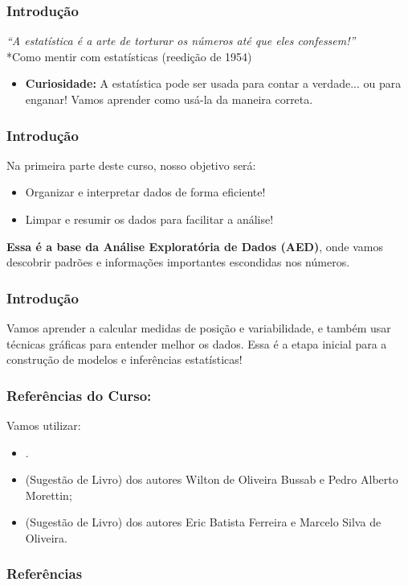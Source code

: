 \documentclass[12pt]{beamer}
\begin{document}
\begin{frame}{}
	\frametitle{Introdução}
	\begin{block}{}
		\justifying
		\textit{``A estatística é a arte de torturar os números até que eles confessem!''}\\
		*Como mentir com estatísticas \cite{huff2016mentir} (reedição de 1954)
		\begin{itemize}
			\item \textbf{Curiosidade:} A estatística pode ser usada para contar a verdade... ou para enganar! Vamos aprender como usá-la da maneira correta.
		\end{itemize}
	\end{block}
\end{frame}

\begin{frame}{}
	\frametitle{Introdução}
	\begin{block}{}
		\justifying
		Na primeira parte deste curso, nosso objetivo será:
		\begin{itemize}
			\item Organizar e interpretar dados de forma eficiente!
			\item Limpar e resumir os dados para facilitar a análise!
		\end{itemize}
		\pause
		\textbf{Essa é a base da Análise Exploratória de Dados (AED)}, onde vamos descobrir padrões e informações importantes escondidas nos números.
	\end{block}
\end{frame}

\begin{frame}{}
	\frametitle{Introdução}
	\begin{block}{}
		\justifying
		Vamos aprender a calcular medidas de posição e variabilidade, e também usar técnicas gráficas para entender melhor os dados. Essa é a etapa inicial para a construção de modelos e inferências estatísticas!
	\end{block}
\end{frame}

\begin{frame}{}
	\frametitle{Referências do Curso:}
	\begin{block}{}
		\justifying
		Vamos utilizar:
		\begin{itemize}
			\item {}.
			\item (Sugestão de Livro)  dos autores Wilton de Oliveira Bussab e Pedro Alberto Morettin;
			\item (Sugestão de Livro) 
			 dos autores Eric Batista Ferreira e Marcelo Silva de Oliveira.
		\end{itemize}
	\end{block}
\end{frame}


\begin{frame}[allowframebreaks]
\frametitle{\bf Referências}
\justifying
\printbibliography[heading=none]
\end{frame}
\end{document}
